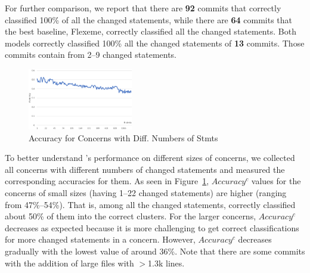  For further comparison, we report
that there are {\bf 92} commits that {\tool} correctly classified
100\% of all the changed statements, while there are {\bf 64} commits
that the best baseline, Flexeme, correctly classified all the
changed statements. Both models correctly classified 100\% all the
changed statements of {\bf 13} commits.  Those commits contain from
2--9 changed statements.
       



\begin{figure}[t]
	\centering \includegraphics[width=1.8in]{figures/accuracy-concerns.png}
	\vspace{-6pt}
	\caption{Accuracy for Concerns with Diff. Numbers of Stmts}
	\label{acc-concerns}
\end{figure}

To better understand {\tool}'s performance on different sizes of
concerns, we collected all concerns with different numbers of changed
statements and measured the corresponding accuracies for them.  As
seen in Figure~\ref{acc-concerns}, $Accuracy^{c}$ values for the concerns of
small sizes (having 1--22 changed statements) are higher (ranging
from 47\%--54\%). That is, among all the changed statements, {\tool}
correctly classified about 50\% of them into the correct clusters.
For the larger concerns, $Accuracy^{c}$ decreases as expected because
it is more challenging to get correct classifications for more changed
statements in a concern. However, $Accuracy^{c}$ decreases gradually with the
lowest value of around 36\%. Note that there are some commits with the
addition of large files with $>$1.3k lines.

